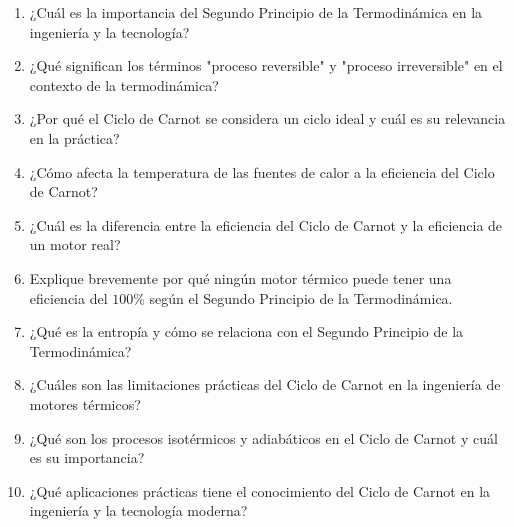\documentclass[../main]{subfiles}
\begin{document}

\begin{enumerate}
\item ¿Cuál es la importancia del Segundo Principio de la Termodinámica en la ingeniería y la tecnología?
\item ¿Qué significan los términos "proceso reversible" y "proceso irreversible" en el contexto de la termodinámica?
\item ¿Por qué el Ciclo de Carnot se considera un ciclo ideal y cuál es su relevancia en la práctica?
\item ¿Cómo afecta la temperatura de las fuentes de calor a la eficiencia del Ciclo de Carnot?
\item ¿Cuál es la diferencia entre la eficiencia del Ciclo de Carnot y la eficiencia de un motor real?
\item Explique brevemente por qué ningún motor térmico puede tener una eficiencia del $100\%$ según el Segundo Principio de la Termodinámica.
\item ¿Qué es la entropía y cómo se relaciona con el Segundo Principio de la Termodinámica?
\item ¿Cuáles son las limitaciones prácticas del Ciclo de Carnot en la ingeniería de motores térmicos?
\item ¿Qué son los procesos isotérmicos y adiabáticos en el Ciclo de Carnot y cuál es su importancia?
\item ¿Qué aplicaciones prácticas tiene el conocimiento del Ciclo de Carnot en la ingeniería y la tecnología moderna?
\end{enumerate}
\end{document}
